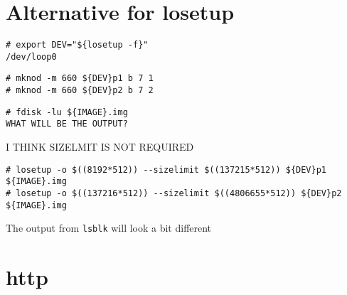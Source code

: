 \section{Alternative for losetup}
\label{sec:alternative_losetup}

\begin{lstlisting}[]
# export DEV="${losetup -f}"
/dev/loop0
\end{lstlisting}
\FloatBarrier
\vspace{-5mm}

\begin{lstlisting}[]
# mknod -m 660 ${DEV}p1 b 7 1
# mknod -m 660 ${DEV}p2 b 7 2
\end{lstlisting}
\FloatBarrier
\vspace{-5mm}

\begin{lstlisting}[]
# fdisk -lu ${IMAGE}.img
WHAT WILL BE THE OUTPUT?
\end{lstlisting}
\FloatBarrier
\vspace{-5mm}

I THINK SIZELMIT IS NOT REQUIRED
\begin{lstlisting}[]
# losetup -o $((8192*512)) --sizelimit $((137215*512)) ${DEV}p1 ${IMAGE}.img
# losetup -o $((137216*512)) --sizelimit $((4806655*512)) ${DEV}p2 ${IMAGE}.img
\end{lstlisting}
\FloatBarrier
\vspace{-5mm}

The output from \texttt{lsblk} will look a bit different


\section{http}
\label{sec:http}